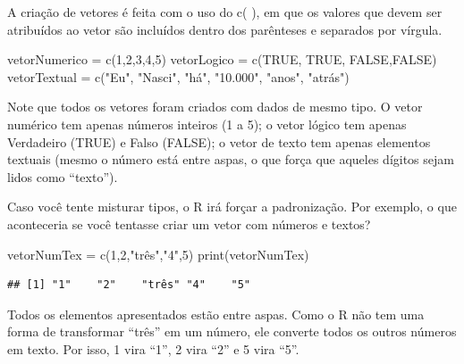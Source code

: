 \documentclass[
]{book}
\newenvironment{Shaded}{\begin{snugshade}}{\end{snugshade}}
\newcommand{\ConstantTok}[1]{\textcolor[rgb]{0.00,0.00,0.00}{#1}}
\newcommand{\DecValTok}[1]{\textcolor[rgb]{0.00,0.00,0.81}{#1}}
\newcommand{\FunctionTok}[1]{\textcolor[rgb]{0.00,0.00,0.00}{#1}}
\newcommand{\NormalTok}[1]{#1}
\newcommand{\OtherTok}[1]{\textcolor[rgb]{0.56,0.35,0.01}{#1}}
\newcommand{\StringTok}[1]{\textcolor[rgb]{0.31,0.60,0.02}{#1}}
\begin{document}
A criação de vetores é feita com o uso do c( ), em que os valores que devem ser atribuídos ao vetor são incluídos dentro dos parênteses e separados por vírgula.

\begin{Shaded}
\begin{Highlighting}[]
\NormalTok{vetorNumerico }\OtherTok{=} \FunctionTok{c}\NormalTok{(}\DecValTok{1}\NormalTok{,}\DecValTok{2}\NormalTok{,}\DecValTok{3}\NormalTok{,}\DecValTok{4}\NormalTok{,}\DecValTok{5}\NormalTok{)}
\NormalTok{vetorLogico }\OtherTok{=} \FunctionTok{c}\NormalTok{(}\ConstantTok{TRUE}\NormalTok{, }\ConstantTok{TRUE}\NormalTok{, }\ConstantTok{FALSE}\NormalTok{,}\ConstantTok{FALSE}\NormalTok{)}
\NormalTok{vetorTextual }\OtherTok{=} \FunctionTok{c}\NormalTok{(}\StringTok{"Eu"}\NormalTok{, }\StringTok{"Nasci"}\NormalTok{, }\StringTok{"há"}\NormalTok{, }\StringTok{"10.000"}\NormalTok{, }\StringTok{"anos"}\NormalTok{, }\StringTok{"atrás"}\NormalTok{)}
\end{Highlighting}
\end{Shaded}

Note que todos os vetores foram criados com dados de mesmo tipo. O vetor numérico tem apenas números inteiros (1 a 5); o vetor lógico tem apenas Verdadeiro (TRUE) e Falso (FALSE); o vetor de texto tem apenas elementos textuais (mesmo o número está entre aspas, o que força que aqueles dígitos sejam lidos como ``texto'').

Caso você tente misturar tipos, o R irá forçar a padronização. Por exemplo, o que aconteceria se você tentasse criar um vetor com números e textos?

\begin{Shaded}
\begin{Highlighting}[]
\NormalTok{vetorNumTex }\OtherTok{=} \FunctionTok{c}\NormalTok{(}\DecValTok{1}\NormalTok{,}\DecValTok{2}\NormalTok{,}\StringTok{"três"}\NormalTok{,}\StringTok{"4"}\NormalTok{,}\DecValTok{5}\NormalTok{)}
\FunctionTok{print}\NormalTok{(vetorNumTex)}
\end{Highlighting}
\end{Shaded}

\begin{verbatim}
## [1] "1"    "2"    "três" "4"    "5"
\end{verbatim}

Todos os elementos apresentados estão entre aspas. Como o R não tem uma forma de transformar ``três'' em um número, ele converte todos os outros números em texto. Por isso, 1 vira ``1'', 2 vira ``2'' e 5 vira ``5''.
\end{document}
